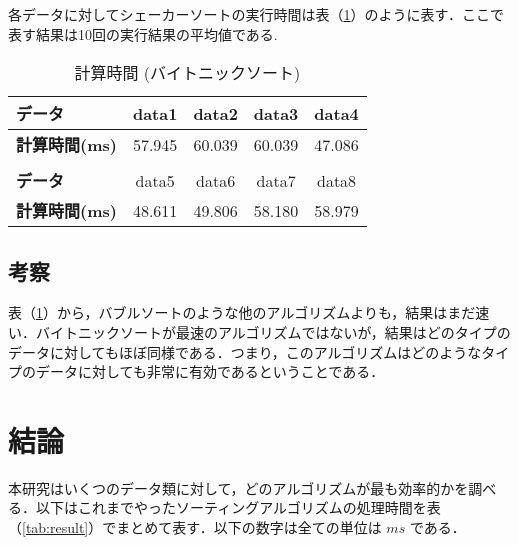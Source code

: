 \documentclass[a4j, titlepage]{jarticle}
\begin{document}
            各データに対してシェーカーソートの実行時間は表（\ref{tab:bitonic}）のように表す．ここで表す結果は10回の実行結果の平均値である.

            \begin{table}[tbh]
                \caption{計算時間 (バイトニックソート)}
                \label{tab:bitonic}
                \begin{center}
                    \begin{tabular}{lcccc}
                        \hline
                        \textbf{データ} & data1 & data2 &data3 &data4 \\ \hline
                        \textbf{計算時間(ms)} & 57.945 & 60.039 & 60.039 & 47.086 \\ \hline
                        \\ \hline
                        \textbf{データ} & data5 &data6 &data7 &data8\\ \hline
                        \textbf{計算時間(ms)} & 48.611 & 49.806 & 58.180 & 58.979 \\ \hline
                    \end{tabular}
                \end{center}
            \end{table}
        
        \subsection{考察}
            表（\ref{tab:bitonic}）から，バブルソートのような他のアルゴリズムよりも，結果はまだ速い．バイトニックソートが最速のアルゴリズムではないが，結果はどのタイプのデータに対してもほぼ同様である．つまり，このアルゴリズムはどのようなタイプのデータに対しても非常に有効であるということである．

        
    \section{結論}
        本研究はいくつのデータ類に対して，どのアルゴリズムが最も効率的かを調べる．以下はこれまでやったソーティングアルゴリズムの処理時間を表（\ref{tab:result}）でまとめて表す．以下の数字は全ての単位は $ms$ である．
\end{document}
